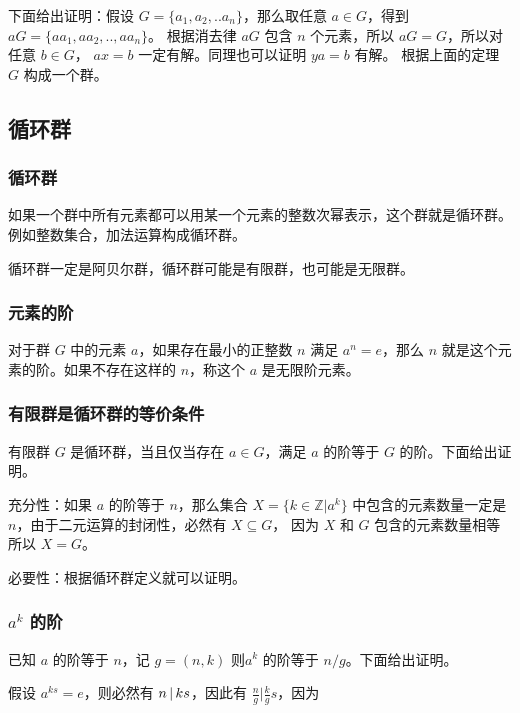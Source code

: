 下面给出证明：假设 $G = \{ a_1, a_2, .. a_n \}$，那么取任意 $a \in G$，得到 $aG = \{ aa_1, aa_2, .., aa_n\}$。
根据消去律 $aG$ 包含 $n$ 个元素，所以 $aG = G$，所以对任意 $b \in G$， $ax = b$ 一定有解。同理也可以证明 $ya = b$ 有解。
根据上面的定理 $G$ 构成一个群。



\subsection{循环群}


\subsubsection{循环群}

如果一个群中所有元素都可以用某一个元素的整数次幂表示，这个群就是循环群。例如整数集合，加法运算构成循环群。

循环群一定是阿贝尔群，循环群可能是有限群，也可能是无限群。

\subsubsection{元素的阶}

对于群 $G$ 中的元素 $a$，如果存在最小的正整数 $n$ 满足 $a^n = e$，那么 $n$ 就是这个元素的阶。如果不存在这样的 $n$，称这个 $a$ 是无限阶元素。


\subsubsection{有限群是循环群的等价条件}

有限群 $G$ 是循环群，当且仅当存在 $a \in G$，满足 $a$ 的阶等于 $G$ 的阶。下面给出证明。

充分性：如果 $a$ 的阶等于 $n$，那么集合 $X = \{ k \in \mathbb{Z} | a^k \}$ 中包含的元素数量一定是 $n$，由于二元运算的封闭性，必然有 $X \subseteq G$，
因为 $X$ 和 $G$ 包含的元素数量相等所以 $X = G$。

必要性：根据循环群定义就可以证明。


\subsubsection{$a^k$ 的阶}

已知 $a$ 的阶等于 $n$，记 $g = (n,k)$ 则$a^k$ 的阶等于 $n/g$。下面给出证明。

假设 $a^{ks} = e$，则必然有 $n \,\vert\, ks$，因此有 $\frac{n}{g} \vert \frac{k}{g}s $，因为 

